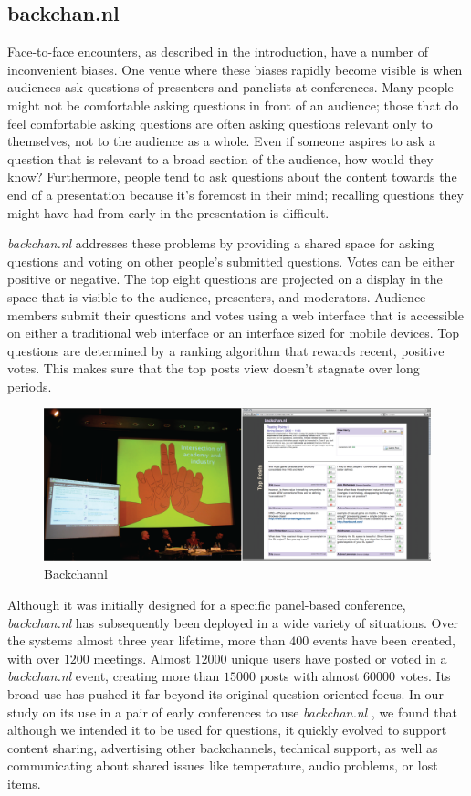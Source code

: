 \documentclass{tufte-handout}
\begin{document}
\subsection{backchan.nl}

Face-to-face encounters, as described in the introduction, have a number of inconvenient biases. One venue where these biases rapidly become visible is when audiences ask questions of presenters and panelists at conferences. Many people might not be comfortable asking questions in front of an audience; those that do feel comfortable asking questions are often asking questions relevant only to themselves, not to the audience as a whole. Even if someone aspires to ask a question that is relevant to a broad section of the audience, how would they know? Furthermore, people tend to ask questions about the content towards the end of a presentation because it's foremost in their mind; recalling questions they might have had from early in the presentation is difficult.

\emph{backchan.nl} addresses these problems by providing a shared space for asking questions and voting on other people's submitted questions. Votes can be either positive or negative. The top eight questions are projected on a display in the space that is visible to the audience, presenters, and moderators. Audience members submit their questions and votes using a web interface that is accessible on either a traditional web interface or an interface sized for mobile devices. Top questions are determined by a ranking algorithm that rewards recent, positive votes. This makes sure that the top posts view doesn't stagnate over long periods. 

\begin{figure}[t]
	\includegraphics{figures/backchannl.png}
	\caption{Backchannl}
	\label{fig:backchannl}
\end{figure}


Although it was initially designed for a specific panel-based conference, \emph{backchan.nl} has subsequently been deployed in a wide variety of situations. Over the systems almost three year lifetime, more than $400$ events have been created, with over $1200$ meetings. Almost $12000$ unique users have posted or voted in a \emph{backchan.nl} event, creating more than $15000$ posts with almost $60000$ votes. Its broad use has pushed it far beyond its original question-oriented focus. In our study on its use in a pair of early conferences to use \emph{backchan.nl} \citep{Harry:2009jh}, we found that although we intended it to be used for questions, it quickly evolved to support content sharing, advertising other backchannels, technical support, as well as communicating about shared issues like temperature, audio problems, or lost items.
\end{document}
